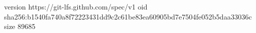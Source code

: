 version https://git-lfs.github.com/spec/v1
oid sha256:b1540fa740a8f72223431dd9c2c61be83ea60905bd7e7504fe052b5daa33036c
size 89685
